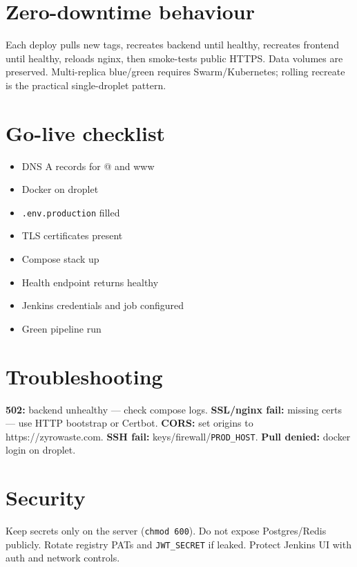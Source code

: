 \documentclass[12pt,a4paper]{article}
\begin{document}
\section{Zero-downtime behaviour}
Each deploy pulls new tags, recreates backend until healthy, recreates frontend until healthy, reloads nginx, then smoke-tests public HTTPS. Data volumes are preserved. Multi-replica blue/green requires Swarm/Kubernetes; rolling recreate is the practical single-droplet pattern.

\section{Go-live checklist}
\begin{itemize}
  \item[\(\square\)] DNS A records for @ and www
  \item[\(\square\)] Docker on droplet
  \item[\(\square\)] \texttt{.env.production} filled
  \item[\(\square\)] TLS certificates present
  \item[\(\square\)] Compose stack up
  \item[\(\square\)] Health endpoint returns healthy
  \item[\(\square\)] Jenkins credentials and job configured
  \item[\(\square\)] Green pipeline run
\end{itemize}

\section{Troubleshooting}
\textbf{502:} backend unhealthy --- check compose logs. \textbf{SSL/nginx fail:} missing certs --- use HTTP bootstrap or Certbot. \textbf{CORS:} set origins to https://zyrowaste.com. \textbf{SSH fail:} keys/firewall/\texttt{PROD\_HOST}. \textbf{Pull denied:} docker login on droplet.

\section{Security}
Keep secrets only on the server (\texttt{chmod 600}). Do not expose Postgres/Redis publicly. Rotate registry PATs and \texttt{JWT\_SECRET} if leaked. Protect Jenkins UI with auth and network controls.
\end{document}
